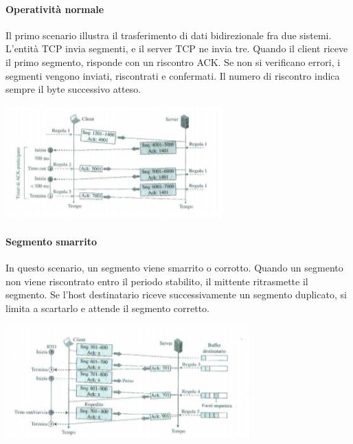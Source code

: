 \documentclass[12pt]{report}
\begin{document}
	\paragraph{Operatività normale} Il primo scenario illustra il trasferimento di dati bidirezionale fra due sistemi. L'entità TCP invia segmenti, e il server TCP ne invia tre. Quando il client riceve il primo segmento, risponde con un riscontro ACK. Se non si verificano errori, i segmenti vengono inviati, riscontrati e confermati. Il numero di riscontro indica sempre il byte successivo atteso.
	\begin{center}
		\includegraphics[scale=1.2]{assets/scenario1.png}
	\end{center}
	
	\paragraph{Segmento smarrito} In questo scenario, un segmento viene smarrito o corrotto. Quando un segmento non viene riscontrato entro il periodo stabilito, il mittente ritrasmette il segmento. Se l'host destinatario riceve successivamente un segmento duplicato, si limita a scartarlo e attende il segmento corretto.
	\begin{center}
		\includegraphics[scale=1.2]{assets/scenario2.png}
	\end{center}
	
\end{document}
